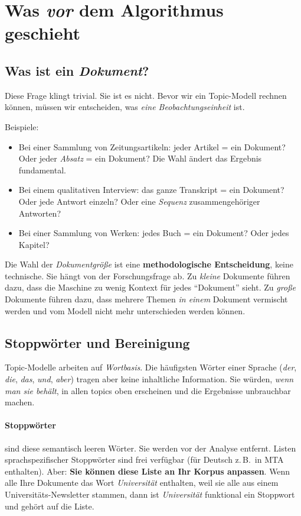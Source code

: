 \documentclass[a4paper,11pt]{article}
\begin{document}
\section{Was \emph{vor} dem Algorithmus geschieht}

\subsection{Was ist ein \emph{Dokument}?}

Diese Frage klingt trivial. Sie ist es nicht. Bevor wir ein
Topic-Modell rechnen können, müssen wir entscheiden, was \emph{eine
Beobachtungseinheit} ist.

Beispiele:
\begin{itemize}
\item Bei einer Sammlung von Zeitungsartikeln: jeder Artikel = ein
Dokument? Oder jeder \emph{Absatz} = ein Dokument? Die Wahl ändert
das Ergebnis fundamental.
\item Bei einem qualitativen Interview: das ganze Transkript = ein
Dokument? Oder jede Antwort einzeln? Oder eine \emph{Sequenz}
zusammengehöriger Antworten?
\item Bei einer Sammlung von Werken: jedes Buch = ein Dokument? Oder
jedes Kapitel?
\end{itemize}

Die Wahl der \emph{Dokumentgröße} ist eine \textbf{methodologische
Entscheidung}, keine technische. Sie hängt von der Forschungsfrage ab.
Zu \emph{kleine} Dokumente führen dazu, dass die Maschine zu wenig
Kontext für jedes \enquote{Dokument} sieht. Zu \emph{große} Dokumente
führen dazu, dass mehrere Themen \emph{in einem} Dokument vermischt
werden und vom Modell nicht mehr unterschieden werden können.

\subsection{Stoppwörter und Bereinigung}

Topic-Modelle arbeiten auf \emph{Wortbasis}. Die häufigsten Wörter
einer Sprache (\emph{der}, \emph{die}, \emph{das}, \emph{und},
\emph{aber}) tragen aber keine inhaltliche Information. Sie würden,
\emph{wenn man sie behält}, in allen topics oben erscheinen und die
Ergebnisse unbrauchbar machen.

\paragraph{Stoppwörter} sind diese semantisch leeren Wörter. Sie
werden vor der Analyse entfernt. Listen sprachspezifischer Stoppwörter
sind frei verfügbar (für Deutsch z.\,B.\ in MTA enthalten). Aber:
\textbf{Sie können diese Liste an Ihr Korpus anpassen}. Wenn alle Ihre
Dokumente das Wort \emph{Universität} enthalten, weil sie alle aus
einem Universitäts-Newsletter stammen, dann ist \emph{Universität}
funktional ein Stoppwort und gehört auf die Liste.
\end{document}
